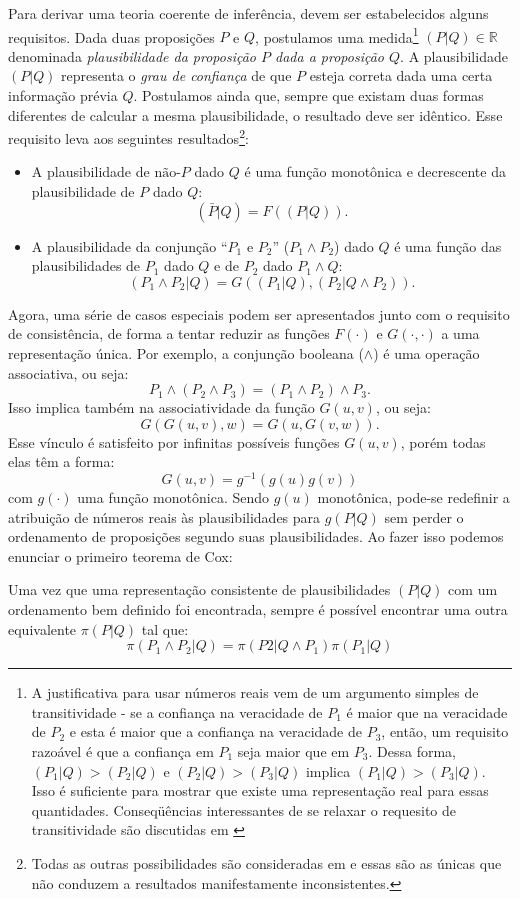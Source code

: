 Para derivar uma teoria coerente de inferência, devem ser estabelecidos alguns requisitos. Dada duas proposições $P$ e $Q$, postulamos uma medida\footnote{A justificativa para usar números reais vem de um argumento simples de transitividade - se a confiança na veracidade de $P_1$ é maior que na veracidade de $P_2$ e esta é maior que a confiança na veracidade de $P_3$, então, um requisito razoável é que a confiança em $P_1$ seja maior que em $P_3$. Dessa forma, $(P_1|Q)>(P_2|Q)$ e $(P_2|Q)>(P_3|Q)$ implica $(P_1|Q)>(P_3|Q)$. Isso é suficiente para mostrar que existe uma representação real para essas quantidades. Conseqüências interessantes de se relaxar o requesito de transitividade são discutidas em  \citet{Goyal2010}}\cite{Goyal2010} $(P | Q) \in \mathbb{R}$ denominada \textit{plausibilidade da proposição $P$ dada a proposição $Q$}. A plausibilidade $(P|Q)$ representa o \emph{grau de confiança} de que $P$ esteja correta dada uma certa informação prévia $Q$. 
 Postulamos ainda que, sempre que existam duas formas diferentes de calcular a mesma plausibilidade, o resultado deve ser idêntico. Esse requisito leva aos seguintes resultados\footnote{Todas as outras possibilidades são consideradas em \citet{Tribus1969} e essas são as únicas que não conduzem a resultados manifestamente inconsistentes.}\cite{Tribus1969}:
\begin{itemize}
\item A plausibilidade de $\text{não-}P$ dado $Q$ é uma função monotônica e decrescente da plausibilidade de $P$ dado $Q$: 
\[
 (\bar{P}|Q) = F(({P}|Q)).
\]
\item A plausibilidade da conjunção ``$P_1$ e $P_2$'' ($P_1\wedge P_2$) dado $Q$ é uma função das plausibilidades de $P_1$ dado $Q$ e de $P_2$ dado $P_1\wedge Q$:
\[
 (P_1\wedge P_2|Q) = G((P_1|Q), (P_2|Q\wedge P_2)).
\]
\end{itemize}

Agora, uma série de casos especiais podem ser apresentados junto com o requisito de consistência, de forma a tentar reduzir as funções $F(\cdot)$ e $G(\cdot,\cdot)$ a uma representação única. Por exemplo, a conjunção booleana ($\wedge$) é uma operação associativa, ou seja:
\[
P_1\wedge (P_2 \wedge P_3) =  (P_1\wedge P_2) \wedge P_3.
\] 
Isso implica também na associatividade da função $G(u,v)$, ou seja:
\[
G(G(u,v),w) = G(u,G(v,w)). 
\]
Esse vínculo é satisfeito por infinitas possíveis funções $G(u,v)$, porém todas elas \cite{ACaticha2008, Aczel1975} têm a forma:
\[
 G(u,v)  = g^{-1}(g(u) g(v)) 
\]
com $g(\cdot)$ uma função monotônica. Sendo $g(u)$ monotônica, pode-se redefinir a atribuição de números reais às plausibilidades para $g(P|Q)$ sem perder o ordenamento de proposições segundo suas plausibilidades. Ao fazer isso podemos enunciar o primeiro teorema de Cox:
\begin{Teorema}
 Uma vez que uma representação consistente de plausibilidades $(P|Q)$ com um ordenamento bem definido foi encontrada, sempre é possível encontrar uma outra equivalente $\pi(P|Q)$ tal que:
\begin{equation}
 \pi(P_1\wedge P_2|Q) = \pi(P2 | Q \wedge P_1) \pi(P_1| Q)
\end{equation}
\end{Teorema}

